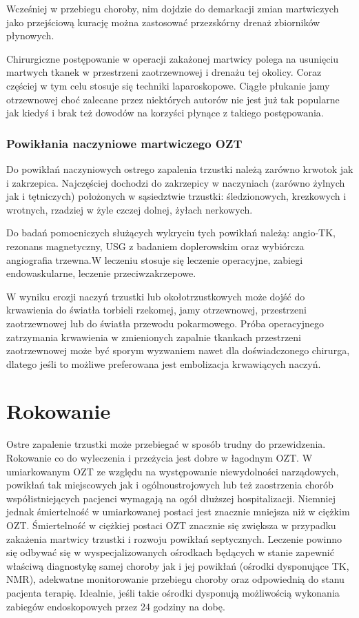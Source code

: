 \documentclass[a4paper, 12pt]{report}
\begin{document}
Wcześniej w przebiegu choroby, nim dojdzie do demarkacji zmian
martwiczych jako przejściową kurację można zastosować przezskórny
drenaż zbiorników płynowych. 

Chirurgiczne postępowanie w operacji zakażonej martwicy polega na
usunięciu martwych tkanek w przestrzeni zaotrzewnowej i drenażu tej
okolicy. Coraz częściej w tym celu stosuje się techniki laparoskopowe.
Ciągłe płukanie jamy otrzewnowej choć zalecane przez niektórych autorów nie
jest już tak popularne jak kiedyś i brak też dowodów na korzyści płynące z
takiego postępowania.

\subsection*{Powikłania naczyniowe martwiczego OZT}

Do powikłań naczyniowych ostrego zapalenia trzustki należą zarówno
krwotok jak i zakrzepica. Najczęściej dochodzi do zakrzepicy w
naczyniach (zarówno żylnych jak i tętniczych) położonych w sąsiedztwie
trzustki: śledzionowych, krezkowych i wrotnych, rzadziej w żyle czczej
dolnej, żyłach nerkowych. 

Do badań pomocniczych służących wykryciu tych powikłań należą:
angio-TK, rezonans magnetyczny, USG z badaniem doplerowskim oraz
wybiórcza angiografia trzewna.W leczeniu stosuje się leczenie
operacyjne, zabiegi endowaskularne, leczenie przeciwzakrzepowe.

W wyniku erozji naczyń trzustki lub okołotrzustkowych może dojść do
krwawienia do światła torbieli rzekomej, jamy otrzewnowej, przestrzeni
zaotrzewnowej lub do światła przewodu pokarmowego. Próba operacyjnego
zatrzymania krwawienia w zmienionych zapalnie tkankach przestrzeni
zaotrzewnowej może być sporym wyzwaniem nawet dla doświadczonego
chirurga, dlatego jeśli to możliwe preferowana jest embolizacja
krwawiących naczyń. 

\chapter{Rokowanie}

Ostre zapalenie trzustki może przebiegać w sposób trudny do
przewidzenia. Rokowanie co do wyleczenia i przeżycia jest dobre w
łagodnym OZT. W umiarkowanym OZT ze względu na występowanie
niewydolności narządowych, powikłań tak miejscowych jak i
ogólnoustrojowych lub też zaostrzenia chorób współistniejących
pacjenci wymagają na ogół dłuższej hospitalizacji. Niemniej jednak
śmiertelność w umiarkowanej postaci jest znacznie mniejsza niż w
ciężkim OZT. Śmiertelność w ciężkiej postaci OZT znacznie się zwiększa
w przypadku zakażenia martwicy trzustki i rozwoju powikłań
septycznych. Leczenie powinno się odbywać się w wyspecjalizowanych
ośrodkach będących w stanie zapewnić właściwą diagnostykę samej
choroby jak i jej powikłań (ośrodki dysponujące TK, NMR), adekwatne
monitorowanie przebiegu choroby oraz odpowiednią do stanu pacjenta
terapię. Idealnie, jeśli takie ośrodki dysponują możliwością wykonania
zabiegów endoskopowych przez 24 godziny na dobę.
\end{document}
